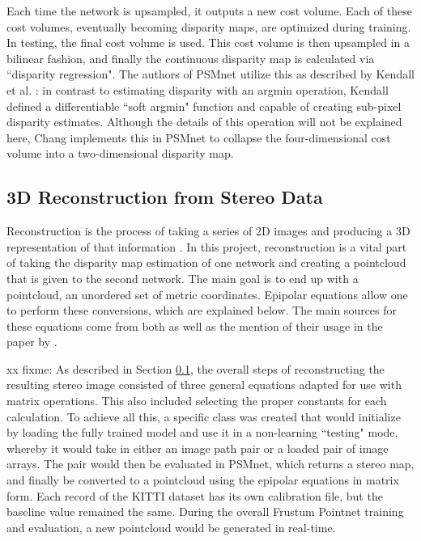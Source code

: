 Each time the network is upsampled, it outputs a new cost volume. Each of these cost volumes, eventually becoming disparity maps, are optimized during training. In testing, the final cost volume is used. This cost volume is then upsampled in a bilinear fashion, and finally the continuous disparity map is calculated via ``disparity regression". The authors of PSMnet utilize this as described by Kendall et al. \cite{kendall_end--end_2017}: in contrast to estimating disparity with an argmin operation, Kendall defined a differentiable ``soft argmin" function and capable of creating sub-pixel disparity estimates. Although the details of this operation will not be explained here, Chang implements this in PSMnet to collapse the four-dimensional cost volume into a two-dimensional disparity map. 





\subsection{3D Reconstruction from Stereo Data}
\label{sect_reconstruct}
Reconstruction is the process of taking a series of 2D images and producing a 3D representation of that information \cite{szeliski_computer_2010}. In this project, reconstruction is a vital part of taking the disparity map estimation of one network and creating a pointcloud that is given to the second network. The main goal is to end up with a pointcloud, an unordered set of metric coordinates. Epipolar equations allow one to perform these conversions, which are explained below. The main sources for these equations come from both \cite{szeliski_computer_2010} as well as the mention of their usage in the paper by \cite{wang_pseudo-lidar_2019}. 

xx fixme: As described in Section \ref{sect_reconstruct}, the overall steps of reconstructing the resulting stereo image consisted of three general equations adapted for use with matrix operations. This also included selecting the proper constants for each calculation. To achieve all this, a specific class was created that would initialize by loading the fully trained model and use it in a non-learning ``testing" mode, whereby it would take in either an image path pair or a loaded pair of image arrays. The pair would then be evaluated in PSMnet, which returns a stereo map, and finally be converted to a pointcloud using the epipolar equations in matrix form. Each record of the KITTI dataset has its own calibration file, but the baseline value remained the same. During the overall Frustum Pointnet training and evaluation, a new pointcloud would be generated in real-time.

